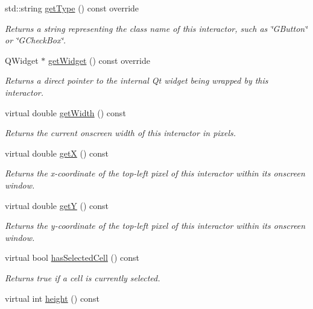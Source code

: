 \begin{DoxyCompactItemize}
std\+::string \mbox{\hyperlink{classGTable_a9b72ede4ee8520f987a0c01e30654814}{get\+Type}} () const override
\begin{DoxyCompactList}\small\item\em Returns a string representing the class name of this interactor, such as \char`\"{}\+G\+Button\char`\"{} or \char`\"{}\+G\+Check\+Box\char`\"{}. \end{DoxyCompactList}\item 
Q\+Widget $\ast$ \mbox{\hyperlink{classGTable_a3b33a602b31a6b809d020535a59db3b4}{get\+Widget}} () const override
\begin{DoxyCompactList}\small\item\em Returns a direct pointer to the internal Qt widget being wrapped by this interactor. \end{DoxyCompactList}\item 
virtual double \mbox{\hyperlink{classGInteractor_a0ed2965abd4f5701d2cadf71239faf19}{get\+Width}} () const
\begin{DoxyCompactList}\small\item\em Returns the current onscreen width of this interactor in pixels. \end{DoxyCompactList}\item 
virtual double \mbox{\hyperlink{classGInteractor_a344385751bee0720059403940d57a13e}{getX}} () const
\begin{DoxyCompactList}\small\item\em Returns the x-\/coordinate of the top-\/left pixel of this interactor within its onscreen window. \end{DoxyCompactList}\item 
virtual double \mbox{\hyperlink{classGInteractor_aafa51c7f8f38a09febbb9ce7853f77b4}{getY}} () const
\begin{DoxyCompactList}\small\item\em Returns the y-\/coordinate of the top-\/left pixel of this interactor within its onscreen window. \end{DoxyCompactList}\item 
virtual bool \mbox{\hyperlink{classGTable_a4a1007a3d14cd35f0bd514cc0b29886b}{has\+Selected\+Cell}} () const
\begin{DoxyCompactList}\small\item\em Returns true if a cell is currently selected. \end{DoxyCompactList}\item 
virtual int \mbox{\hyperlink{classGTable_ad3774f6419003470f54fd495124ef51f}{height}} () const

\end{DoxyCompactItemize}
